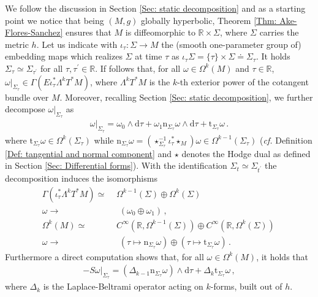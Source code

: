 We follow the discussion in Section \ref{Sec: static decomposition} and as a starting point we notice that being $(M,g)$ globally hyperbolic, Theorem \ref{Thm: Ake-Flores-Sanchez} ensures that $M$ is diffeomorphic to $\mathbb{R}\times\Sigma$, where $\Sigma$ carries the metric $h$.
Let us indicate with $\iota_\tau\colon\Sigma\to M$ the (smooth one-parameter group of) embedding maps which realizes $\Sigma$ at time $\tau$ as $\iota_\tau\Sigma=\lbrace \tau\rbrace\times\Sigma\doteq\Sigma_\tau$. It holds $\Sigma_\tau\simeq\Sigma_{\tau^\prime}$ for all $\tau,\tau^\prime\in\mathbb{R}$.
If follows that, for all $\omega\in\Omega^k(M)$ and $\tau\in\mathbb{R}$, $\omega|_{\Sigma_\tau}\in  \Gamma(E\iota_\tau^*\Lambda^kT^*M)$, where $\Lambda^k T^* {M}$ is the $k$-th exterior power of the cotangent bundle over ${M}$.
Moreover, recalling Section \ref{Sec: static decomposition}, we further decompose $\omega|_{\Sigma_\tau}$ as
\begin{align*}
\omega|_{\Sigma_\tau}=\omega_0\wedge\mathrm{d}\tau+\omega_1
\mathrm{n}_{\Sigma_\tau}\omega\wedge\mathrm{d}\tau+
\mathrm{t}_{\Sigma_\tau}\omega\,.
\end{align*}
where $\mathrm{t}_{\Sigma_\tau}\omega\in\Omega^k(\Sigma_\tau)$ while $\mathrm{n}_{\Sigma_\tau}\omega=(\star_{\Sigma_\tau}^{-1}\iota_\tau^*\star_M)\omega\in\Omega^{k-1}(\Sigma_\tau)$ (\textit{cf.} Definition \ref{Def: tangential and normal component} and $\star$ denotes the Hodge dual as defined in Section \ref{Sec: Differential forms}).
With the identification $\Sigma_t\simeq\Sigma_{t^\prime}$ the decomposition induces the isomorphisms
\begin{align}
\nonumber \Gamma(\iota_\tau^*\Lambda^kT^*M)\simeq\,\, &\Omega^{k-1}(\Sigma)\oplus \Omega^k(\Sigma)\\
\omega\to&\,\,(\omega_0\oplus\omega_1)\,,\\
\label{Eqn: identification isomorphism for k-forms on ultrastatic spacetimes}
\nonumber \Omega^k(M)\simeq\, &C^\infty(\mathbb{R},\Omega^{k-1}(\Sigma))\oplus C^\infty(\mathbb{R},\Omega^k(\Sigma))\,\\
\omega\to&\,\,(\tau\mapsto\mathrm{n}_{\Sigma_\tau}\omega)\oplus(\tau\mapsto\mathrm{t}_{\Sigma_\tau}\omega)\,.
\end{align}
Furthermore a direct computation shows that, for all $\omega\in\Omega^k(M)$, it holds that
\begin{align*}
-S\omega|_{\Sigma_\tau}=(\Delta_{k-1}\mathrm{n}_{\Sigma_\tau}\omega)\wedge \mathrm{d}\tau+\Delta_k\mathrm{t}_{\Sigma_\tau}\omega\,,
\end{align*}
where $\Delta_k$ is the Laplace-Beltrami operator acting on $k$-forms, built out of $h$.

